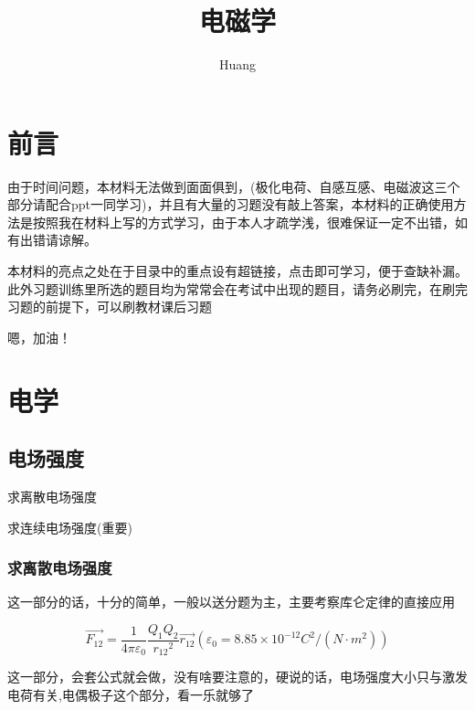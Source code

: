 \documentclass[lang=cn,10pt]{elegantbook}
\title{电磁学}
\author{ Huang}
\begin{document}
	
	\maketitle
	\frontmatter
	
	\tableofcontents
	
	\mainmatter
	\chapter{前言}
	由于时间问题，本材料无法做到面面俱到，(极化电荷、自感互感、电磁波这三个部分请配合ppt一同学习)，并且有大量的习题没有敲上答案，本材料的正确使用方法是按照我在材料上写的方式学习，由于本人才疏学浅，很难保证一定不出错，如有出错请谅解。
	
	本材料的亮点之处在于目录中的重点设有超链接，点击即可学习，便于查缺补漏。此外习题训练里所选的题目均为常常会在考试中出现的题目，请务必刷完，在刷完习题的前提下，可以刷教材课后习题
	
	嗯，加油！
	\chapter{电学}
	\section{电场强度}
	\begin{introduction}
		\item 求离散电场强度
		\item 求连续电场强度(重要)
	\end{introduction}
	\subsection{求离散电场强度}
	这一部分的话，十分的简单，一般以送分题为主，主要考察库仑定律的直接应用
	\begin{theorem}[库仑定律]
		\begin{equation*}
		\overrightarrow{F_{12}}=\frac{1}{4\pi \varepsilon _0}\frac{Q_1Q_2}{{r_{12}}^2}\overrightarrow{r_{12}}\left( \varepsilon _0=8.85\times 10^{-12}C^2/\left( N\cdot m^2 \right) \right) 
		\end{equation*}
	\end{theorem}
		这一部分，会套公式就会做，没有啥要注意的，硬说的话，电场强度大小只与激发电荷有关,电偶极子这个部分，看一乐就够了
		
		\subsection{\color{red} }
		
\end{document}
